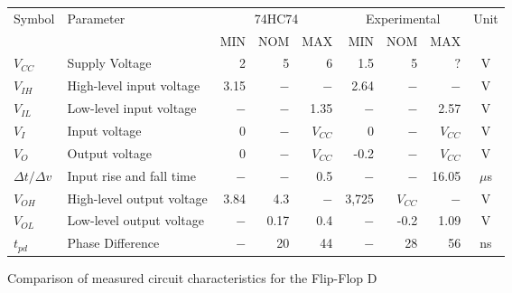 \begin{tabular}{|l|l|r|r|r|r|r|r|c|}
    \toprule
    Symbol  &Parameter  &\multicolumn{3}{c|}{74HC74}&\multicolumn{3}{c|}{Experimental}&Unit\\
            &           &   MIN&NOM&MAX&MIN&NOM&MAX&\\
    \midrule
    $V_{CC}$&Supply Voltage&2&5&6&1.5&5&$?$&V\\
    $V_{IH}$&High-level input voltage&3.15&$-$&$-$&2.64&$-$&$-$&V\\
    $V_{IL}$&Low-level input voltage&$-$&$-$&1.35&$-$&$-$&2.57&V\\
    $V_{I}$ &Input voltage&0&$-$&$V_{CC}$&0&$-$&$V_{CC}$&V\\
    $V_{O}$ &Output voltage&0&$-$&$V_{CC}$&-0.2&$-$&$V_{CC}$&V\\
    $\Delta t / \Delta v$&  Input rise and fall time&$-$&$-$&0.5&$-$&$-$&16.05&$\mu$s\\
    \midrule
    $V_{OH}$&High-level output voltage&3.84&4.3&$-$&3,725&$V_{CC}$&$-$&V\\
    $V_{OL}$&Low-level output voltage &$-$&0.17&0.4&$-$&-0.2&1.09&V\\
    \midrule
    $t_{pd}$&Phase Difference&$-$&20&44&$-$&28&56&ns\\  %
    \bottomrule
\end{tabular}
\caption{Comparison of measured circuit characteristics for the Flip-Flop D}
